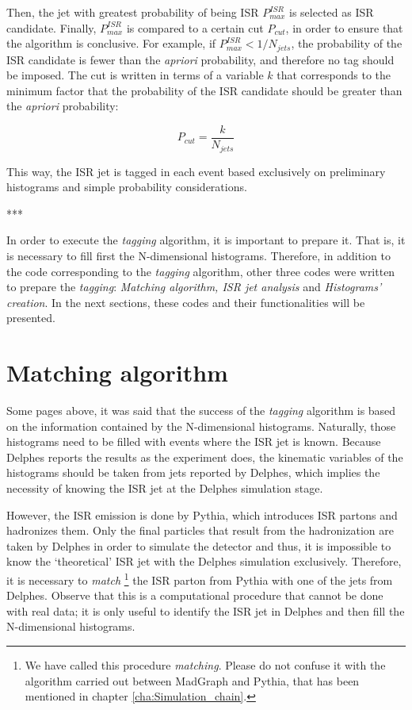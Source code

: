\documentclass[12pt, oneside]{book}              %
\begin{document}
Then, the jet with greatest probability of being ISR $ P^{ISR}_{max} $ is selected as ISR candidate.
Finally, $ P^{ISR}_{max} $ is compared to a certain cut $ P_{cut} $, in order to ensure that the
algorithm is conclusive. For example, if $ P^{ISR}_{max} < 1/N_{jets} $, the probability of the
ISR candidate is fewer than the \textit{apriori} probability, and therefore no tag should be
imposed. The cut is written in terms of a variable $ k $ that corresponds to the minimum factor
that the probability of the ISR candidate should be greater than the \textit{apriori} probability:

\begin{equation} \label{eq:Prob_cut}
P_{cut} = \frac{k}{N_{jets}}
\end{equation}

This way, the ISR jet is tagged in each event based exclusively on preliminary histograms and 
simple probability considerations.

\begin{center}
	***
\end{center}

In order to execute the \textit{tagging} algorithm, it is important to prepare
it. That is, it is necessary to fill first the N-dimensional histograms. Therefore,
in addition to the code corresponding to the \textit{tagging} algorithm, other
three codes were written to prepare the \textit{tagging}: \textit{Matching algorithm,
ISR jet analysis} and \textit{Histograms' creation}. In the next sections,
these codes and their functionalities will be presented.

\section{Matching algorithm}\label{sec:Matching}

Some pages above, it was said that the success of the \textit{tagging} algorithm
is based on the information contained by the N-dimensional histograms.
Naturally, those histograms need to be filled with events
where the ISR jet is known. Because Delphes reports the results as the 
experiment does, the kinematic variables of the histograms should be taken
from jets reported by Delphes, which implies the necessity of knowing the ISR
jet at the Delphes simulation stage.

However, the ISR emission is done by Pythia, which introduces ISR partons and
hadronizes them. Only the final particles that result from the hadronization are 
taken by Delphes in order to simulate the detector and thus, it is impossible 
to know the \textquoteleft theoretical' ISR jet with the Delphes simulation exclusively. 
Therefore, it is necessary to \textit{match} \footnote{We have called this procedure 
\textit{matching}. Please do not confuse it with the algorithm carried out
between MadGraph and Pythia, that has been mentioned in chapter \ref{cha:Simulation_chain}.} the ISR parton from Pythia with one of the jets 
from Delphes. Observe that this is a computational procedure that cannot be
done with real data; it is only useful to identify the ISR jet in Delphes
and then fill the N-dimensional histograms.
\end{document}

